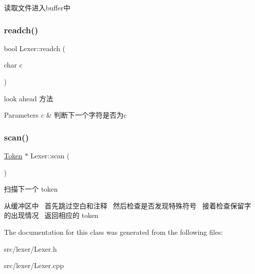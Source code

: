 读取文件进入buffer中 \mbox{\label{class_lexer_acbe68a5d98ebc3b3a87fd27f000030a5}} 
\subsubsection{\texorpdfstring{readch()}{readch()}}
{\footnotesize\ttfamily bool Lexer\+::readch (\begin{DoxyParamCaption}\item[{char}]{c }\end{DoxyParamCaption})}



look ahead 方法 


\begin{DoxyParams}{Parameters}
{\em c} & 判断下一个字符是否为c \\
\hline
\end{DoxyParams}
\mbox{\label{class_lexer_a2085b8262f6237de60583375ee2731f4}} 
\subsubsection{\texorpdfstring{scan()}{scan()}}
{\footnotesize\ttfamily \hyperlink{class_token}{Token} $\ast$ Lexer\+::scan (\begin{DoxyParamCaption}{ }\end{DoxyParamCaption})}



扫描下一个 token 

从缓冲区中~\newline
首先跳过空白和注释~\newline
然后检查是否发现特殊符号~\newline
接着检查保留字的出现情况~\newline
返回相应的 token~\newline


The documentation for this class was generated from the following files\+:\begin{DoxyCompactItemize}
\item 
src/lexer/Lexer.\+h\item 
src/lexer/Lexer.\+cpp\end{DoxyCompactItemize}
